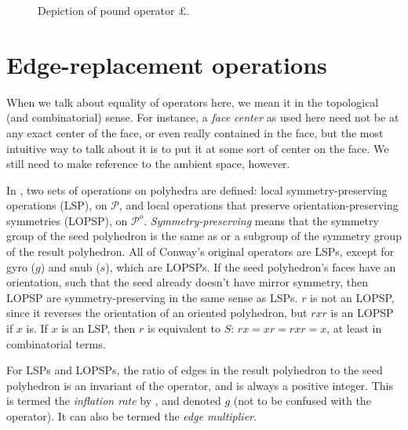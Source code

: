 \documentclass{amsart}[12pt]
\begin{document}
\begin{figure}[!htbp]

\caption{Depiction of pound operator $\pounds$.}
\label{fig:pound}
\end{figure}

\section{Edge-replacement operations}
When we talk about equality of operators here, we mean it in the topological
(and combinatorial) sense. For instance, a \textit{face center} as used here
need not be at any exact center of the face, or even really contained in the
face, but the most intuitive way to talk about it is to put it at some sort of
center on the face. We still need to make reference to the ambient space,
however.

In \cite{brinkmann}, two sets of operations on polyhedra are defined: local
symmetry-preserving operations (LSP), on $\mathcal{P}$, and local operations
that preserve orientation-preserving symmetries (LOPSP), on $\mathcal{P}^o$.
\textit{Symmetry-preserving} means that the symmetry group of the seed
polyhedron is the same as or a subgroup of the symmetry group of the result
polyhedron. All of Conway's original operators are LSPs,
except for gyro ($g$) and snub ($s$), which are LOPSPs. If the seed
polyhedron's faces have an orientation, such that the seed already doesn't
have mirror symmetry, then LOPSP are symmetry-preserving in the same sense as
LSPs. $r$ is not an LOPSP, since it reverses the orientation of an oriented
polyhedron, but $rxr$ is an LOPSP if $x$ is. If $x$ is an LSP, then $r$ is
equivalent to $S$: $rx = xr = rxr = x$, at least in combinatorial terms.

For LSPs and LOPSPs, the ratio of edges in the result polyhedron to the seed
polyhedron is an invariant of the operator, and is always a positive integer.
This is termed the \textit{inflation rate} by \cite{brinkmann},
and denoted $g$ (not to be confused with the operator).
It can also be termed the \textit{edge multiplier}.
\end{document}
